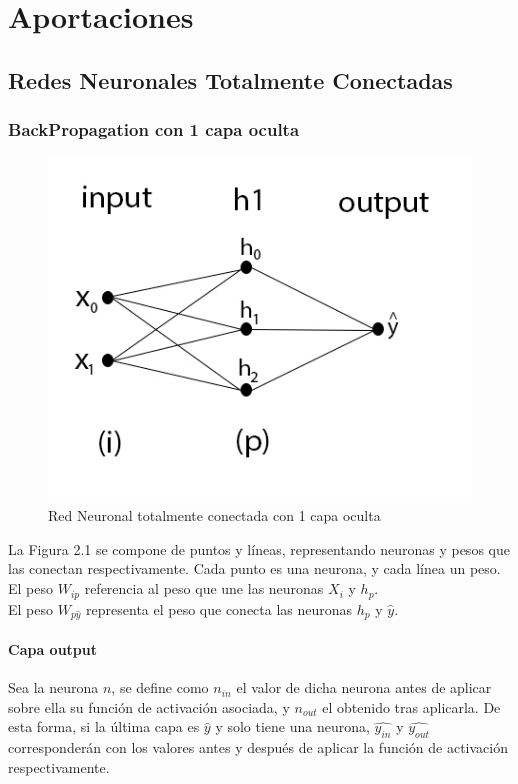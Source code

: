 \chapter{Aportaciones}

\section{Redes Neuronales Totalmente Conectadas}
\subsection{BackPropagation con 1 capa oculta}

\begin{figure}[H]
	\centering
	\includegraphics[scale=0.35]{imagenes/nn_1_capa.jpg}  
	\caption{Red Neuronal totalmente conectada con 1 capa oculta}
	\label{fig:nn_1_capa}
\end{figure}

La Figura 2.1 se compone de puntos y líneas, representando neuronas y pesos que las conectan respectivamente. Cada punto es una neurona, y cada línea un peso. \\
El peso $W_{ip}$ referencia al peso que une las neuronas $X_i$ y $h_p$.\\
El peso $W_{p\hat{y}}$ representa el peso que conecta las neuronas $h_p$ y $\hat{y}$.


\subsubsection{Capa output}

Sea la neurona $n$, se define como $n_{in}$ el valor de dicha neurona antes de aplicar sobre ella su función de activación asociada, y $n_{out}$ el obtenido tras aplicarla.
De esta forma, si la última capa es $\hat{y}$ y solo tiene una neurona, $\hat{y_{in}}$ y $\hat{y_{out}}$ corresponderán con los valores antes y después de aplicar la función de activación respectivamente.\\

